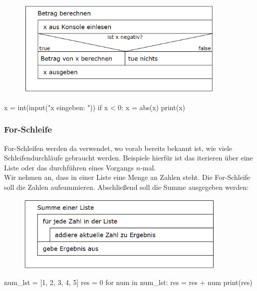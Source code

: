 \begin{minipage}{.45\textwidth}
\centering
\begin{figure}[H]
	\begin{center}
		\includegraphics[width=0.9\textwidth]{imgs/if_clause.png} %
	\end{center}
\end{figure}
\end{minipage}
\begin{minipage}{.45\textwidth}
\begin{python}
x = int(input("x eingeben: "))
if x < 0:
	x = abs(x)
print(x)
\end{python}
\end{minipage}

\subsubsection{For-Schleife}
For-Schleifen werden da verwendet, wo vorab bereits bekannt ist, wie viele Schleifendurchläufe gebraucht werden. Beispiele hierfür ist das iterieren über eine Liste oder das durchführen eines Vorgangs $n$-mal.\\
Wir nehmen an, dass in einer Liste eine Menge an Zahlen steht. Die For-Schleife soll die Zahlen aufsummieren. Abschließend soll die Summe ausgegeben werden:

\begin{minipage}{.45\textwidth}
	\centering
	\begin{figure}[H]
		\begin{center}
			\includegraphics[width=0.9\textwidth]{imgs/for_loop.png} %
		\end{center}
	\end{figure}
\end{minipage}
\begin{minipage}{.45\textwidth}
\begin{python}
num_lst = [1, 2, 3, 4, 5]
res = 0
for num in num_lst:
	res = res + num
print(res)
\end{python}
\end{minipage}

